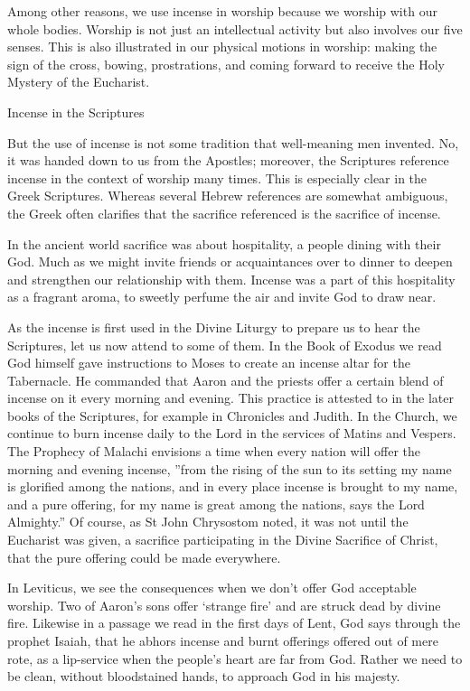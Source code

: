 \documentclass[
]{article}
\newcommand{\RL}[1]{\beginR #1\endR}
\begin{document}
Among other reasons, we use incense in worship because we worship with
our whole bodies. Worship is not just an intellectual activity but also
involves our five senses. This is also illustrated in our physical
motions in worship: making the sign of the cross, bowing, prostrations,
and coming forward to receive the Holy Mystery of the Eucharist.

Incense in the Scriptures

But the use of incense is not some tradition that well-meaning men
invented. No, it was handed down to us from the Apostles; moreover, the
Scriptures reference incense in the context of worship many times. This
is especially clear in the Greek Scriptures. Whereas several Hebrew
references are somewhat ambiguous, the Greek often clarifies that the
sacrifice referenced is the sacrifice of incense.

In the ancient world sacrifice was about hospitality, a people dining
with their God. Much as we might invite friends or acquaintances over to
dinner to deepen and strengthen our relationship with them. Incense was
a part of this hospitality as a fragrant aroma, to sweetly perfume the
air and invite God to draw near.

As the incense is first used in the Divine Liturgy to prepare us to hear
the Scriptures, let us now attend to some of them. In the Book of Exodus
we read God himself gave instructions to Moses to create an incense
altar for the Tabernacle. He commanded that Aaron and the priests offer
a certain blend of incense on it every morning and evening. This
practice is attested to in the later books of the Scriptures, for
example in Chronicles and Judith. In the Church, we continue to burn
incense daily to the Lord in the services of Matins and Vespers. The
Prophecy of Malachi envisions a time when every nation will offer the
morning and evening incense, \RL{''}from the rising of the sun to its
setting my name is glorified among the nations, and in every place
incense is brought to my name, and a pure offering, for my name is great
among the nations, says the Lord Almighty.'' Of course, as St John
Chrysostom noted, it was not until the Eucharist was given, a sacrifice
participating in the Divine Sacrifice of Christ, that the pure offering
could be made everywhere.

In Leviticus, we see the consequences when we don't offer God acceptable
worship. Two of Aaron's sons offer `strange fire' and are struck dead by
divine fire. Likewise in a passage we read in the first days of Lent,
God says through the prophet Isaiah, that he abhors incense and burnt
offerings offered out of mere rote, as a lip-service when the people's
heart are far from God. Rather we need to be clean, without bloodstained
hands, to approach God in his majesty.
\end{document}
